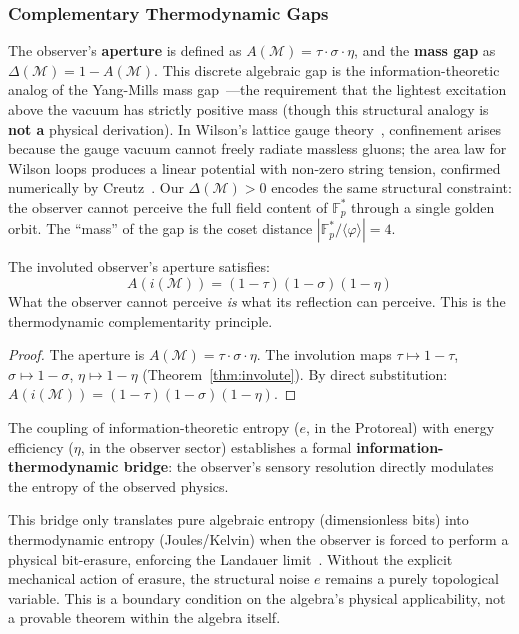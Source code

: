 \subsubsection{Complementary Thermodynamic Gaps}

The observer's \textbf{aperture} is defined as $A(\mathcal{M}) = \tau \cdot \sigma \cdot \eta$, and the \textbf{mass gap} as $\Delta(\mathcal{M}) = 1 - A(\mathcal{M})$. This discrete algebraic gap is the information-theoretic analog of the Yang-Mills mass gap~\cite{jaffe2000}---the requirement that the lightest excitation above the vacuum has strictly positive mass (though this structural analogy is \textbf{not a} physical derivation). In Wilson's lattice gauge theory~\cite{wilson1974}, confinement arises because the gauge vacuum cannot freely radiate massless gluons; the area law for Wilson loops produces a linear potential with non-zero string tension, confirmed numerically by Creutz~\cite{creutz1980}. Our $\Delta(\mathcal{M}) > 0$ encodes the same structural constraint: the observer cannot perceive the full field content of $\mathbb{F}_p^*$ through a single golden orbit. The ``mass'' of the gap is the coset distance $|\mathbb{F}_p^* / \langle\varphi\rangle| = 4$.

\begin{theorem}
The involuted observer's aperture satisfies:
\begin{equation}
    A(i(\mathcal{M})) = (1 - \tau)(1 - \sigma)(1 - \eta)
\end{equation}
What the observer cannot perceive \emph{is} what its reflection can perceive. This is the thermodynamic complementarity principle.
\end{theorem}
\begin{proof}
The aperture is $A(\mathcal{M}) = \tau \cdot \sigma \cdot \eta$. The involution maps $\tau \mapsto 1 - \tau$, $\sigma \mapsto 1 - \sigma$, $\eta \mapsto 1 - \eta$ (Theorem~\ref{thm:involute}). By direct substitution: $A(i(\mathcal{M})) = (1 - \tau)(1 - \sigma)(1 - \eta)$. \qedhere
\end{proof}

The coupling of information-theoretic entropy ($e$, in the Protoreal) with energy efficiency ($\eta$, in the observer sector) establishes a formal \textbf{information-thermodynamic bridge}: the observer's sensory resolution directly modulates the entropy of the observed physics. 

\begin{remark}
This bridge only translates pure algebraic entropy (dimensionless bits) into thermodynamic entropy (Joules/Kelvin) when the observer is forced to perform a physical bit-erasure, enforcing the Landauer limit~\cite{landauer61}. Without the explicit mechanical action of erasure, the structural noise $e$ remains a purely topological variable. This is a boundary condition on the algebra's physical applicability, not a provable theorem within the algebra itself.
\end{remark}

